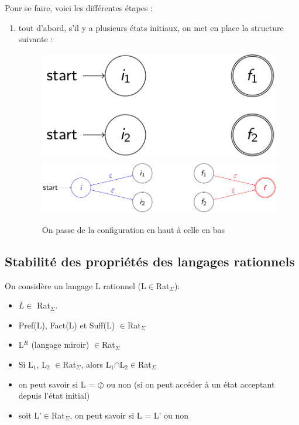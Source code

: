 \documentclass{article}
\begin{document}
Pour se faire, voici les différentes étapes :
\begin{enumerate}
    \item tout d'abord, s'il y a plusieurs états initiaux, on met en place la structure suivante :
        \begin{figure}[h]
            \centering
            \includegraphics[scale=0.4]{without_clusk.png}
            \includegraphics[scale=0.4]{with_clusk.png}
            \caption{On passe de la configuration en haut à celle en bas}
        \end{figure}
\end{enumerate}

\subsection{Stabilité des propriétés des langages rationnels}
On considère un langage L rationnel (L$\in$Rat$_{\Sigma}$):
\begin{itemize}
    \item $\overline{L} \in$ Rat$_{\Sigma}$.
    \item Pref(L), Fact(L) et Suff(L) $\in$Rat$_{\Sigma}$
    \item L$^{R}$ (langage miroir) $\in$Rat$_{\Sigma}$
    \item Si L$_{1}$, L$_{2}$ $\in$Rat$_{\Sigma}$, alors L$_{1}$$\cap$L$_{2}$$\in$Rat$_{\Sigma}$
    \item on peut savoir si L = $\oslash$ ou non (si on peut accéder à un état acceptant depuis l'état initial)
    \item soit L'$\in$Rat$_{\Sigma}$, on peut savoir si L = L' ou non
\end{itemize}
\newpage
\end{document}
